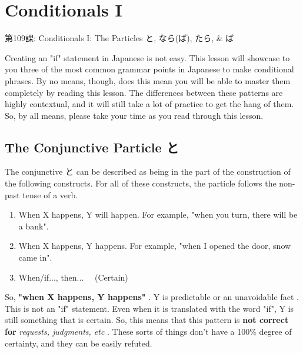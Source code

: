     
\chapter{Conditionals I}

\begin{center}
\begin{Large}
第109課: Conditionals I: The Particles と, なら(ば), たら, \& ば 
\end{Large}
\end{center}
 
\par{ Creating an "if" statement in Japanese is not easy. This lesson will showcase to you three of the most common grammar points in Japanese to make conditional phrases. By no means, though, does this mean you will be able to master them completely by reading this lesson. The differences between these patterns are highly contextual, and it will still take a lot of practice to get the hang of them. So, by all means, please take your time as you read through this lesson. }
      
\section{The Conjunctive Particle と}
 
\par{  The conjunctive と can be described as being in the part of the construction of the following constructs. For all of these constructs, the particle follows the non-past tense of a verb. }
 
\begin{enumerate}
 
\item When X happens, Y will happen. For example, "when you      turn, there will be a bank".  
\item When X happens, Y happens. For example, "when I opened the      door, snow came in".  
\item When\slash if\dothyp{}\dothyp{}\dothyp{}, then\dothyp{}\dothyp{}\dothyp{}   (Certain)  
\end{enumerate}
 
\par{So, \textbf{"when X happens, Y happens" }. Y is predictable or an unavoidable fact . This is not an "if" statement. Even when it is translated with the word "if", Y is still something that is certain. So, this means that this pattern is \textbf{not correct for }\emph{requests, judgments, etc }. These sorts of things don't have a 100\% degree of certainty, and they can be easily refuted. }


